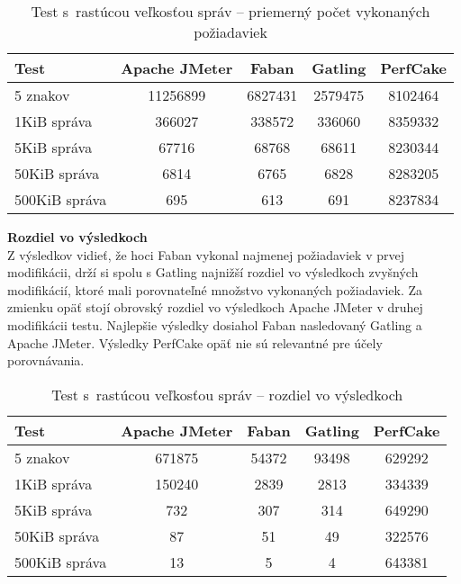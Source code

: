 \documentclass[12pt,oneside,final]{fithesis-utf8}
\begin{document}
\begin{itemize}
\begin{table}[H]
\begin{center}
\begin{tabular}{ | l | c | c | c | c |}
		\hline
		 \textbf{Test} & \textbf{Apache JMeter} & \textbf{Faban} & \textbf{Gatling} & \textbf{PerfCake} \\ \hline
		 5 znakov & 11256899 & 6827431 & 2579475 & 8102464 \\ \hline
 		 1KiB správa & 366027 & 338572 & 336060 & 8359332 \\ \hline
 		 5KiB správa & 67716 & 68768 & 68611 & 8230344 \\ \hline
 		 50KiB správa & 6814 & 6765 & 6828 & 8283205 \\ \hline
		 500KiB správa & 695 & 613 & 691 & 8237834 \\ \hline
		 
\end{tabular}
\end{center}
\caption{Test s~rastúcou veľkosťou správ -- priemerný počet vykonaných požiadaviek}
\end{table}

\textbf{Rozdiel vo výsledkoch}\\
Z výsledkov vidieť, že hoci Faban vykonal najmenej požiadaviek v prvej modifikácii, drží si spolu s Gatling najnižší rozdiel vo výsledkoch zvyšných modifikácií, ktoré mali porovnateľné množstvo vykonaných požiadaviek. Za zmienku opäť stojí obrovský rozdiel vo výsledkoch Apache JMeter v druhej modifikácii testu. Najlepšie výsledky dosiahol Faban nasledovaný Gatling a Apache JMeter. Výsledky PerfCake opäť nie sú relevantné pre účely porovnávania.

\begin{table}[H]
\begin{center}
\begin{tabular}{ | l | c | c | c | c |}
		\hline
		 \textbf{Test} & \textbf{Apache JMeter} & \textbf{Faban} & \textbf{Gatling} & \textbf{PerfCake} \\ \hline
		 5 znakov & 671875 & 54372 & 93498 & 629292 \\ \hline
		 1KiB správa & 150240 & 2839 & 2813 & 334339 \\ \hline
		 5KiB správa & 732 & 307 & 314 & 649290 \\ \hline
		 50KiB správa & 87 & 51 & 49 & 322576 \\ \hline
		 500KiB správa & 13 & 5 & 4 & 643381 \\ \hline
		 
\end{tabular}
\end{center}
\caption{Test s~rastúcou veľkosťou správ -- rozdiel vo výsledkoch}
\end{table}

\end{itemize}
\end{document}
